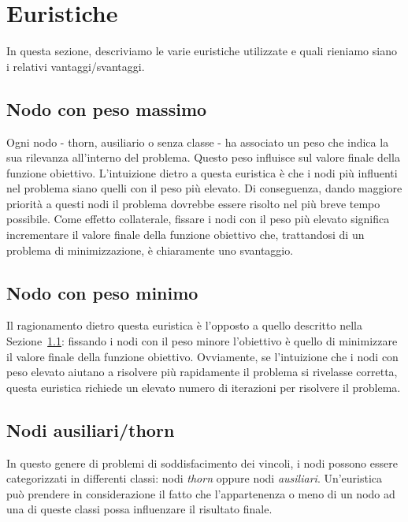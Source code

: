 \section{Euristiche}\label{sec:euristiche}

In questa sezione, descriviamo le varie euristiche utilizzate e quali rieniamo siano i relativi vantaggi/svantaggi.

\subsection{Nodo con peso massimo}\label{subsec:nodo_peso_massimo}

Ogni nodo - thorn, ausiliario o senza classe - ha associato un peso che indica la sua rilevanza all'interno del problema. Questo peso influisce sul valore finale della funzione obiettivo. L'intuizione dietro a questa euristica è che i nodi più influenti nel problema siano quelli con il peso più elevato. Di conseguenza, dando maggiore priorità a questi nodi il problema dovrebbe essere risolto nel più breve tempo possibile. Come effetto collaterale, fissare i nodi con il peso più elevato significa incrementare il valore finale della funzione obiettivo che, trattandosi di un problema di minimizzazione, è chiaramente uno svantaggio.

\subsection{Nodo con peso minimo}\label{subsec:nodo_peso_minimo}

Il ragionamento dietro questa euristica è l'opposto a quello descritto nella Sezione~\ref{subsec:nodo_peso_massimo}: fissando i nodi con il peso minore l'obiettivo è quello di minimizzare il valore finale della funzione obiettivo. Ovviamente, se l'intuizione che i nodi con peso elevato aiutano a risolvere più rapidamente il problema si rivelasse corretta, questa euristica richiede un elevato numero di iterazioni per risolvere il problema.

\subsection{Nodi ausiliari/thorn}\label{subsec:nodi}

In questo genere di problemi di soddisfacimento dei vincoli, i nodi possono essere categorizzati in differenti classi: nodi \textit{thorn} oppure nodi \textit{ausiliari}. Un'euristica può prendere in considerazione il fatto che l'appartenenza o meno di un nodo ad una di queste classi possa influenzare il risultato finale.

